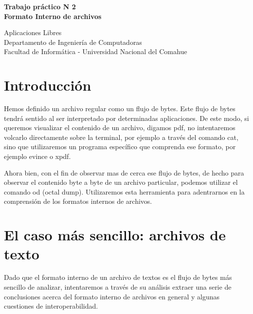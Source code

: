 \documentclass[12pt]{article}
\def\maketitle{

 \makeatletter
 {\color{bl} \centering \huge \sc \textbf{
Trabajo práctico N 2 \\
\large \vspace*{-8pt} \color{black} Formato Interno de archivos
 \vspace*{8pt} }\par}
 \makeatother


 \makeatletter
 {\centering \small 
	Aplicaciones Libres\\
 	Departamento de Ingeniería de Computadoras \\
 	Facultad de Informática - Universidad Nacional del Comahue \\
 	\vspace{20pt} }
 \makeatother

}
\begin{document}
\thispagestyle{empty}
\maketitle
\setlength{\parindent}{0pt}


\section*{Introducción}
Hemos definido un archivo regular como un flujo de bytes. Este flujo de bytes
tendrá sentido al ser interpretado por determinadas aplicaciones. De este modo, 
si queremos visualizar el contenido de un archivo, digamos pdf, no intentaremos
volcarlo directamente sobre la terminal, por ejemplo a través del comando cat, 
sino que utilizaremos un programa específico que comprenda ese formato, por ejemplo 
evince o xpdf. 

Ahora bien, con el fin de observar mas de cerca ese flujo de bytes, de hecho para 
observar el contenido byte a byte de un archivo particular, podemos utilizar el 
comando od (octal dump). Utilizaremos esta herramienta para adentrarnos en 
la comprensión de los formatos internos de archivos.  

\section*{El caso más sencillo: archivos de texto}
Dado que el formato interno de un archivo de textos es el flujo de bytes más
sencillo de analizar, intentaremos a través de su análisis extraer una serie 
de conclusiones acerca del formato interno de archivos en general y algunas 
cuestiones de interoperabilidad. 
\end{document}
